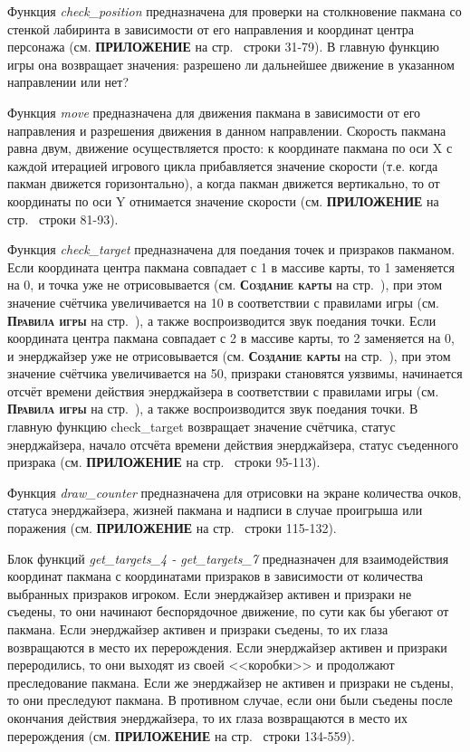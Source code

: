 Функция \textit{check\_position} предназначена для проверки на столкновение пакмана со стенкой лабиринта в зависимости от его направления и координат центра персонажа (см. \textbf{\textsc{ПРИЛОЖЕНИЕ}} на стр.~\pageref{code:player} строки 31-79). В главную функцию игры она возвращает значения: разрешено ли дальнейшее движение в указанном направлении или нет?

Функция \textit{move} предназначена для движения пакмана в зависимости от его направления и разрешения движения в данном направлении. Скорость пакмана равна двум, движение осуществляется просто: к координате пакмана по оси X с каждой итерацией игрового цикла прибавляется значение скорости (т.е. когда пакман движется горизонтально), а когда пакман движется вертикально, то от координаты по оси Y отнимается значение скорости (см. \textbf{\textsc{ПРИЛОЖЕНИЕ}} на стр.~\pageref{code:player} строки 81-93).

Функция \textit{check\_target} предназначена для поедания точек и призраков пакманом. Если координата центра пакмана совпадает с 1 в массиве карты, то 1 заменяется на 0, и точка уже не отрисовывается (см. \textbf{\textsc{Создание карты}} на стр.~\pageref{sec:ch02/sec01/sub04}), при этом значение счётчика увеличивается на 10 в соответствии с правилами игры (см. \textbf{\textsc{Правила игры}} на стр.~\pageref{subsec:ch01/sec04/subsec02}), а также воспроизводится звук поедания точки. Если координата центра пакмана совпадает с 2 в массиве карты, то 2 заменяется на 0, и энерджайзер уже не отрисовывается (см. \textbf{\textsc{Создание карты}} на стр.~\pageref{sec:ch02/sec01/sub04}), при этом значение счётчика увеличивается на 50, призраки становятся уязвимы, начинается отсчёт времени действия энерджайзера в соответствии с правилами игры (см. \textbf{\textsc{Правила игры}} на стр.~\pageref{subsec:ch01/sec04/subsec02}), а также воспроизводится звук поедания точки. В главную функцию check\_target возвращает значение счётчика, статус энерджайзера, начало отсчёта времени действия энерджайзера, статус съеденного призрака (см. \textbf{\textsc{ПРИЛОЖЕНИЕ}} на стр.~\pageref{code:player} строки 95-113).

Функция \textit{draw\_counter} предназначена для отрисовки на экране количества очков, статуса энерджайзера, жизней пакмана и надписи в случае проигрыша или поражения (см. \textbf{\textsc{ПРИЛОЖЕНИЕ}} на стр.~\pageref{code:player} строки 115-132).

Блок функций \textit{get\_targets\_4 - get\_targets\_7} предназначен для взаимодействия координат пакмана с координатами призраков в зависимости от количества выбранных призраков игроком. Если энерджайзер активен и призраки не съедены, то они начинают беспорядочное движение, по сути как бы убегают от пакмана. Если энерджайзер активен и призраки съедены, то их глаза возвращаются в место их перерождения. Если энерджайзер активен и призраки переродились, то они выходят из своей <<коробки>> и продолжают преследование пакмана. Если же энерджайзер не активен и призраки не съдены, то они преследуют пакмана. В противном случае, если они были съедены после окончания действия энерджайзера, то их глаза возвращаются в место их перерождения (см. \textbf{\textsc{ПРИЛОЖЕНИЕ}} на стр.~\pageref{code:player} строки 134-559).


